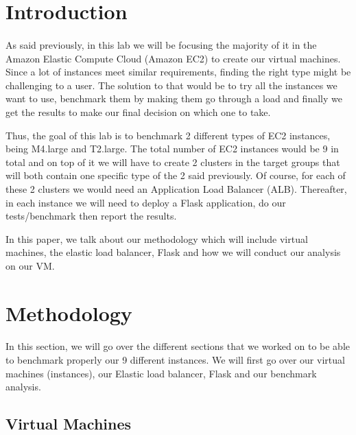 \documentclass[12pt]{article}
\begin{document}
\section{Introduction} \label{sec:introduction}
	\paragraph{} As said previously, in this lab we will be focusing the majority of
	it in the Amazon Elastic Compute Cloud (Amazon EC2) to create our virtual machines.
	Since a lot of instances meet similar requirements, finding the right type might be
	challenging to a user. The solution to that would be to try all the instances we want 
	to use, benchmark them by making them go through a load and finally we get the results 
	to make our final decision on which one to take.
	\cite{1}\bigskip

  \noindent Thus, the goal of this lab is to benchmark 2 different types of EC2 instances, being M4.large and T2.large. The total number of EC2 instances would be 9 in total and on top of it we will have to create 2 clusters in the target groups that will both contain one specific type of the 2 said previously. Of course, for each of these 2 clusters we would need an Application Load Balancer (ALB). Thereafter, in each instance we will need to deploy a Flask application, do our tests/benchmark then report the results.
	\bigskip

        \noindent In this paper, we talk about our methodology which will include virtual machines, the elastic 
	load balancer, Flask and how we will conduct our analysis on our VM.
	\bigskip

	\pagebreak


\section{Methodology} \label{sec:methodology}
	\paragraph{} In this section, we will go over the different sections that we worked on to be able to benchmark properly our 9 different instances. We will first go over our virtual machines (instances), our  Elastic load balancer, Flask and our benchmark analysis. \bigskip

	\subsection{Virtual Machines}
\end{document}
